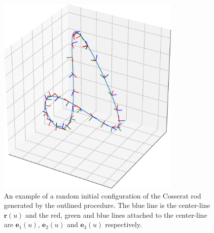 \documentclass[]{cam-thesis}
\begin{document}
\begin{figure}[t]
\centering
        \includegraphics[width=0.8\textwidth]{figs_part2/benchmark_simulations/example_intial_rod_config}
        \caption{An example of a random initial configuration of the Cosserat rod generated by the outlined procedure. The blue line is the center-line $\mathbf{r}(u)$ and the red, green and blue lines attached to the center-line are $\mathbf{e}_1(u)$, $\mathbf{e}_2(u)$ and $\mathbf{e}_3(u)$ respectively.}
        \label{fig:example random initial cosserat configuration}
\end{figure}
\end{document}
